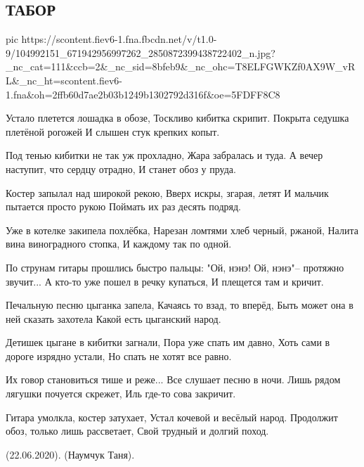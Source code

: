  
 
 

\subsection{ТАБОР}

\ifcmt
pic https://scontent.fiev6-1.fna.fbcdn.net/v/t1.0-9/104992151_671942956997262_2850872399438722402_n.jpg?_nc_cat=111&ccb=2&_nc_sid=8bfeb9&_nc_ohc=T8ELFGWKZf0AX9W_vRL&_nc_ht=scontent.fiev6-1.fna&oh=2ffb60d7ae2b03b1249b1302792d316f&oe=5FDFF8C8
\fi

\begin{multicols}{2}
	\obeycr
Устало плетется лошадка в обозе,
Тоскливо кибитка скрипит.
Покрыта седушка плетёной рогожей
И слышен стук крепких копыт.

Под тенью кибитки не так уж прохладно,
Жара забралась и туда.
А вечер наступит, что сердцу отрадно,
И станет обоз у пруда.

Костер запылал над широкой рекою,
Вверх искры, згарая, летят
И мальчик пытается просто рукою
Поймать их раз десять подряд.

Уже в котелке закипела похлёбка,
Нарезан ломтями хлеб черный, ржаной,
Налита вина виноградного стопка,
И каждому так по одной.

По струнам гитары прошлись быстро пальцы:
"Ой, нэнэ! Ой, нэнэ"-- протяжно звучит...
А кто-то уже пошел в речку купаться,
И плещется там и кричит.

Печальную песню цыганка запела,
Качаясь то взад, то вперёд,
Быть может она в ней сказать захотела
Какой есть цыганский народ.

Детишек цыгане в кибитки загнали,
Пора уже спать им давно,
Хоть сами в дороге изрядно устали,
Но спать не хотят все равно.

Их говор становиться тише и реже...
Все слушает песню в ночи.
Лишь рядом лягушки почуется скрежет,
Иль где-то сова закричит.

Гитара умолкла, костер затухает,
Устал кочевой и весёлый народ.
Продолжит обоз, только лишь рассветает,
Свой трудный и долгий поход.

(22.06.2020). (Наумчук Таня).
	\restorecr
\end{multicols}
